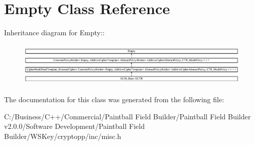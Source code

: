 \hypertarget{class_empty}{
\section{Empty Class Reference}
\label{class_empty}
}
Inheritance diagram for Empty::\begin{figure}[H]
\begin{center}
\leavevmode
\includegraphics[height=2.13333cm]{class_empty}
\end{center}
\end{figure}


The documentation for this class was generated from the following file:\begin{DoxyCompactItemize}
\item 
C:/Business/C++/Commercial/Paintball Field Builder/Paintball Field Builder v2.0.0/Software Development/Paintball Field Builder/WSKey/cryptopp/inc/misc.h\end{DoxyCompactItemize}
